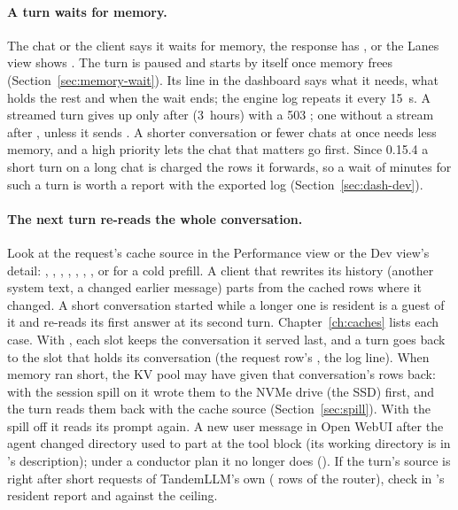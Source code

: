 \paragraph{A turn waits for memory.} The chat or the client says it waits for memory, the response has , or the Lanes view shows . The turn is paused and starts by itself once memory frees (Section~\ref{sec:memory-wait}). Its line in the dashboard says what it needs, what holds the rest and when the wait ends; the engine log repeats it every 15~s. A streamed turn gives up only after  (3~hours) with a 503 ; one without a stream after , unless it sends . A shorter conversation or fewer chats at once needs less memory, and a high priority lets the chat that matters go first. Since 0.15.4 a short turn on a long chat is charged the rows it forwards, so a wait of minutes for such a turn is worth a report with the exported log (Section~\ref{sec:dash-dev}).

\paragraph{The next turn re-reads the whole conversation.} Look at the request's cache source in the Performance view or the Dev view's detail: , , , , , , , or  for a cold prefill. A client that rewrites its history (another system text, a changed earlier message) parts from the cached rows where it changed. A short conversation started while a longer one is resident is a guest of it and re-reads its first answer at its second turn. Chapter~\ref{ch:caches} lists each case. With , each slot keeps the conversation it served last, and a turn goes back to the slot that holds its conversation (the request row's , the \code{[parallel]} log line). When memory ran short, the KV pool may have given that conversation's rows back: with the session spill on it wrote them to the NVMe drive (the SSD) first, and the turn reads them back with the cache source  (Section~\ref{sec:spill}). With the spill off it reads its prompt again. A new user message in Open WebUI after the agent changed directory used to part at the tool block (its working directory is in 's description); under a conductor plan it no longer does (). If the turn's source is  right after short requests of TandemLLM's own ( rows of the router), check  in 's resident report and  against the ceiling.

